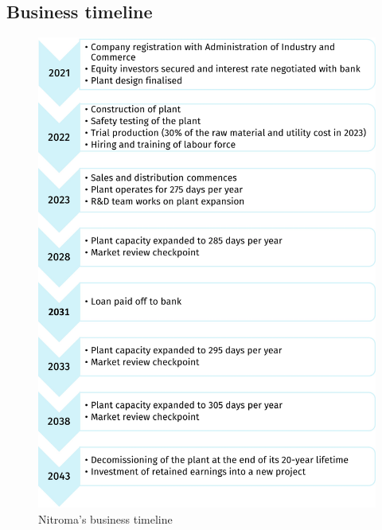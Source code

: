 \subsection{Business timeline}
\label{sec:business-timeline}
\begin{figure}[h]
\centering
 \includegraphics[width=13.2cm]{chapters/6-economics/figures/Business timeline.jpg}
 \caption{Nitroma's business timeline}
 \label{fig:business-timeline}
\end{figure}
